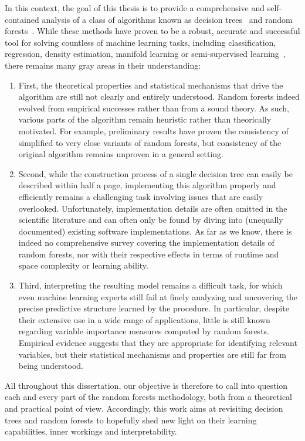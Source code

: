 In this context, the goal of this thesis is to provide a comprehensive and
self-contained analysis of a class of algorithms known as decision
trees~\citep{breiman:1984} and random forests~\citep{breiman:2001}. While these
methods have proven to be a robust, accurate and successful tool for solving
countless of machine learning tasks, including classification, regression,
density estimation, manifold learning or semi-supervised
learning~\citep{criminisi:2013}, there remains many gray areas in their
understanding:
\begin{enumerate}
\item First, the theoretical properties and statistical mechanisms that drive
the algorithm are still not clearly and entirely understood. Random forests
indeed evolved from empirical successes rather than from a sound
theory. As such, various parts of the algorithm remain heuristic rather than
theorically motivated. For example, preliminary
results have proven the consistency of simplified to very close variants of
random forests, but consistency of the original algorithm remains unproven
in a general setting.
\item Second, while the construction process of a single decision tree can
easily be described within half a page, implementing this algorithm properly
and efficiently remains a challenging task involving issues that are easily
overlooked. Unfortunately, implementation details are often omitted in the
scientific literature and can often only be found by diving into
(unequally documented) existing software implementations. As far as we know,
there is indeed no comprehensive survey covering the implementation details of
random forests, nor with their respective effects in terms of runtime and space
complexity or learning ability.
\item Third, interpreting the resulting model remains a difficult task,
for which even machine learning experts still fail at finely analyzing and
uncovering the precise predictive structure learned by the procedure.
In particular, despite their extensive use in a wide range of applications, little
is still known regarding variable importance measures computed by random forests.
Empirical evidence suggests that they are appropriate for identifying
relevant variables, but their statistical mechanisms and properties are
still far from being understood.
\end{enumerate}
All throughout this dissertation, our objective is therefore to call into
question each and every part of the random forests methodology,  both from a
theoretical and practical point of view. Accordingly, this work aims at
revisiting decision trees and random forests to hopefully shed new light on
their learning capabilities, inner workings and interpretability.

